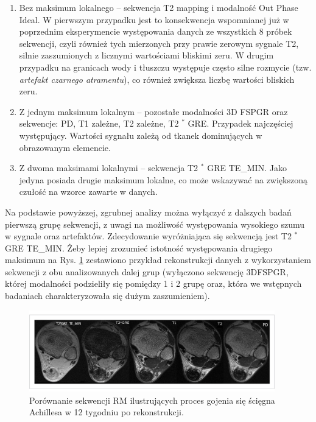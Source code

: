 \begin{enumerate}
	\item Bez maksimum lokalnego -- sekwencja T2 mapping i modalność Out Phase Ideal. W pierwszym przypadku jest to konsekwencja wspomnianej już w poprzednim eksperymencie występowania danych ze wszystkich 8 próbek sekwencji, czyli również tych mierzonych przy prawie zerowym sygnale T2, silnie zaszumionych z licznymi wartościami bliskimi zeru. W drugim przypadku na granicach wody i tłuszczu występuje często silne rozmycie (tzw. \textit{artefakt czarnego atramentu}), co również zwiększa liczbę wartości bliskich zeru.
	\item Z jednym maksimum lokalnym -- pozostałe modalności 3D FSPGR oraz sekwencje: PD, T1 zależne, T2 zależne, T2 $^\ast$ GRE. Przypadek najczęściej występujący. Wartości sygnału zależą od tkanek dominujących w obrazowanym elemencie.
	\item Z dwoma maksimami lokalnymi -- sekwencja T2 $^\ast$ GRE TE\_MIN. Jako jedyna posiada drugie maksimum lokalne, co może wskazywać na zwiększoną czułość na wzorce zawarte w danych.  
	
\end{enumerate}
Na podstawie powyższej, zgrubnej analizy można wyłączyć z dalszych badań pierwszą grupę sekwencji, z uwagi na możliwość występowania wysokiego szumu w sygnale oraz artefaktów. Zdecydowanie wyróżniająca się sekwencją jest T2 $^\ast$ GRE TE\_MIN. Żeby lepiej zrozumieć istotność występowania drugiego maksimum na Rys. \ref{fig:protocol_comp} zestawiono przykład rekonstrukcji danych z wykorzystaniem sekwencji z obu analizowanych dalej grup (wyłączono sekwencję 3DFSPGR, której modalności podzieliły się pomiędzy 1 i 2 grupę oraz, która we wstępnych badaniach charakteryzowała się dużym zaszumieniem). 

 \begin{figure}[h]
 	\centering
 	\includegraphics[width=0.95\textwidth]{figures/Protocol_comparison.jpg}
 	\caption{Porównanie sekwencji RM ilustrujących proces gojenia się ścięgna Achillesa w 12 tygodniu po rekonstrukcji.}\label{fig:protocol_comp}
 \end{figure}


